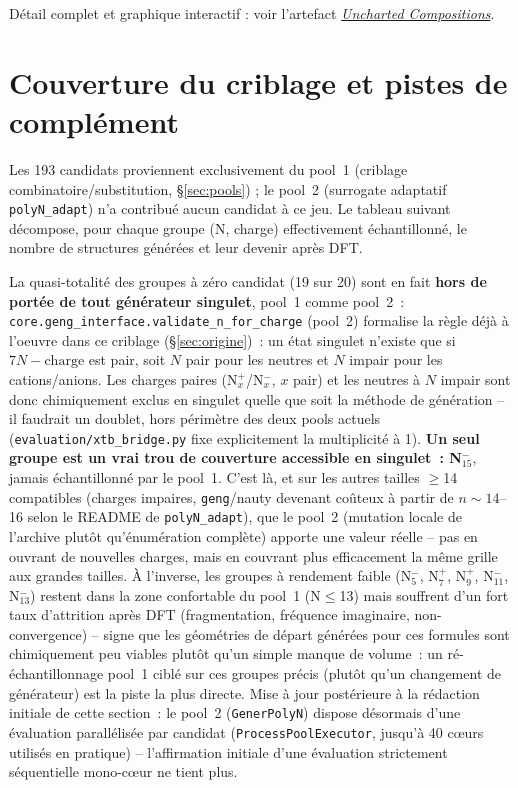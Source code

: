 \documentclass[11pt,a4paper]{article}
\begin{document}
D\'etail complet et graphique interactif : voir l'artefact
\href{https://claude.ai/code/artifact/da2b875a-5560-4a2d-b719-5dbb4d27ddac}{\emph{Uncharted Compositions}}.

\section{Couverture du criblage et pistes de compl\'ement}
\label{sec:coverage}

Les 193 candidats proviennent exclusivement du pool~1 (criblage
combinatoire/substitution, \S\ref{sec:pools}) ; le pool~2 (surrogate
adaptatif \texttt{polyN\_adapt}) n'a contribu\'e aucun candidat \`a ce
jeu. Le tableau suivant d\'ecompose, pour chaque groupe (N, charge)
effectivement \'echantillonn\'e, le nombre de structures g\'en\'er\'ees et
leur devenir apr\`es DFT.





La quasi-totalit\'e des groupes \`a z\'ero candidat (19 sur 20) sont en
fait \textbf{hors de port\'ee de tout g\'en\'erateur singulet}, pool~1
comme pool~2~: \texttt{core.geng\_interface.validate\_n\_for\_charge}
(pool~2) formalise la r\`egle d\'ej\`a \`a l'oeuvre dans ce criblage
(\S\ref{sec:origine})~: un \'etat singulet n'existe que si $7N-\mathrm{charge}$
est pair, soit $N$ pair pour les neutres et $N$ impair pour les
cations/anions. Les charges paires (N$_x^{+}$/N$_x^{-}$, $x$ pair) et les
neutres \`a $N$ impair sont donc chimiquement exclus en singulet quelle
que soit la m\'ethode de g\'en\'eration -- il faudrait un doublet, hors
p\'erim\`etre des deux pools actuels (\texttt{evaluation/xtb\_bridge.py}
fixe explicitement la multiplicit\'e \`a 1). \textbf{Un seul groupe est
un vrai trou de couverture accessible en singulet~: N$_{15}^-$}, jamais
\'echantillonn\'e par le pool~1. C'est l\`a, et sur les autres tailles
$\ge$14 compatibles (charges impaires, \texttt{geng}/nauty devenant
co\^uteux \`a partir de $n{\sim}14$--16 selon le README de
\texttt{polyN\_adapt}), que le pool~2 (mutation locale de l'archive
plut\^ot qu'\'enum\'eration compl\`ete) apporte une valeur r\'eelle --
pas en ouvrant de nouvelles charges, mais en couvrant plus efficacement
la m\^eme grille aux grandes tailles. \`A l'inverse, les groupes \`a
rendement faible (N$_5^-$, N$_7^+$, N$_9^+$, N$_{11}^-$, N$_{13}^-$)
restent dans la zone confortable du pool~1 (N$\le$13) mais souffrent
d'un fort taux d'attrition apr\`es DFT (fragmentation, fr\'equence
imaginaire, non-convergence) -- signe que les g\'eom\'etries de d\'epart
g\'en\'er\'ees pour ces formules sont chimiquement peu viables plut\^ot
qu'un simple manque de volume~: un r\'e-\'echantillonnage pool~1 cibl\'e
sur ces groupes pr\'ecis (plut\^ot qu'un changement de g\'en\'erateur)
est la piste la plus directe. Mise \`a jour post\'erieure \`a la r\'edaction
initiale de cette section~: le pool~2 (\texttt{GenerPolyN}) dispose
d\'esormais d'une \'evaluation parall\'elis\'ee par candidat
(\texttt{ProcessPoolExecutor}, jusqu'\`a 40 c\oe urs utilis\'es en
pratique) -- l'affirmation initiale d'une \'evaluation strictement
s\'equentielle mono-c\oe ur ne tient plus.
\end{document}
